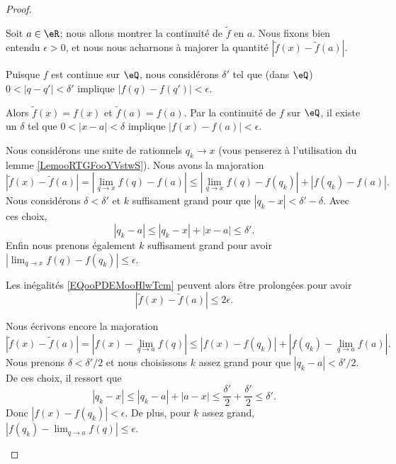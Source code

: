 \begin{proof}
\begin{subproof}
		Soit \( a\in \eR\); nous allons montrer la continuité de \( \tilde f\) en \( a\). Nous fixons bien entendu \( \epsilon>0\), et nous nous acharnons à majorer la quantité \( | \tilde f(x)-\tilde f(a) |\).

		Puisque \( f\) est continue sur \( \eQ\), nous considérons \( \delta'\) tel que (dans \( \eQ\)) \( 0<| q-q' |<\delta'\) implique \( | f(q)-f(q') |<\epsilon\).

		\begin{subproof}
			\spitem[\( a\in \eQ\), \( x\in \eQ\)]
			Alors \( \tilde f(x)=f(x)\) et \( \tilde f(a)=f(a)\). Par la continuité de \( f\) sur \( \eQ\), il existe un \( \delta\) tel que \( 0<| x-a |<\delta\) implique \( | f(x)-f(a) |<\epsilon\).

			\spitem[\( a\in \eQ\), \( x\) irrationnel]
			Nous considérons une suite de rationnels \( q_k\to x\) (vous penserez à l'utilisation du lemme \ref{LemooRTGFooYVstwS}). Nous avons la majoration
			\begin{equation}        \label{EQooPDEMooHlwTcm}
				| \tilde f(x)-\tilde f(a) |=| \lim_{q\to x} f(q)-f(a) |\leq | \lim_{q\to x} f(q)-f(q_k) |+| f(q_k)-f(a) |.
			\end{equation}
			Nous considérons \( \delta<\delta'\) et \( k\) suffisament grand pour que \( | q_k-x |<\delta'-\delta\). Avec ces choix,
			\begin{equation}
				| q_k-a |\leq | q_k-x |+| x-a |\leq \delta'.
			\end{equation}
			Enfin nous prenons également \( k\) suffisament grand pour avoir \( | \lim_{q\to x} f(q)-f(q_k) |\leq \epsilon\).

			Les inégalités \eqref{EQooPDEMooHlwTcm} peuvent alors être prolongées pour avoir
			\begin{equation}
				| \tilde f(x)-\tilde f(a) |\leq 2\epsilon.
			\end{equation}

			\spitem[\( a\) irrationnel, \( x\in \eQ\)]
			Nous écrivons encore la majoration
			\begin{equation}
				| \tilde f(x)-\tilde f(a) |=| f(x)-\lim_{q\to a} f(q) |\leq | f(x)-f(q_k) |+| f(q_k)-\lim_{q\to a} f(a) |.
			\end{equation}
			Nous prenons \( \delta<\delta'/2\) et nous choisissons \( k\) assez grand pour que \( | q_k-a |<\delta'/2\). De ces choix, il ressort que
			\begin{equation}
				| q_k-x |\leq | q_k-a |+| a-x |\leq \frac{ \delta' }{2}+\frac{ \delta' }{2}\leq \delta'.
			\end{equation}
			Donc \( | f(x)-f(q_k) |<\epsilon\). De plus, pour \( k\) assez grand, \( | f(q_k)-\lim_{q\to a} f(q) |\leq \epsilon\).


\end{subproof}
\end{subproof}
\end{proof}
